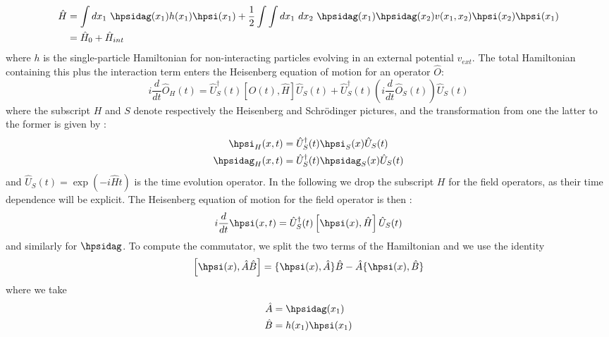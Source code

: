 \begin{align}
\begin{split}
 	\hat{H} &= \int dx_1 \ \hpsidag(x_1) h(x_1) \hpsi(x_1) + \frac{1}{2} \int\int dx_1 \  dx_2 \ \hpsidag(x_1) \hpsidag(x_2) v(x_1,x_2) \hpsi(x_2)\hpsi(x_1) \\
		&= \hat{H}_0 + \hat{H}_{int}
\end{split}
\end{align}
where $h$ is the single-particle Hamiltonian for non-interacting particles evolving in an external potential $v_{ext}$. The total Hamiltonian containing this plus the interaction term enters the Heisenberg equation of motion for an operator $\hat{O}$:
\begin{equation}
	i\frac{d}{d t}\hat{O}_H(t) = \hat{U}^\dagger_S(t) \left[ \hat{O}(t),\hat{H} \right] \hat{U}_S(t) + \hat{U}^\dagger_S(t) (i \frac{d}{dt} \hat{O}_S(t)) \hat{U}_S(t)
\end{equation}
where the subscript $H$ and $S$ denote respectively the Heisenberg and Schrödinger pictures, and the transformation from one the latter to the former is given by :
\begin{align}
\begin{split}
	\hpsi_H(x,t) &= \hat{U}^\dagger_S(t) \hpsi_S(x) \hat{U}_S(t) \\
	\hpsidag_H(x,t) &= \hat{U}^\dagger_S(t) \hpsidag_S(x) \hat{U}_S(t)
\end{split}
\end{align}
and $\hat{U}_S(t) = \exp(-i\hat{H}t) $ is the time evolution operator. In the following we drop the subscript $H$ for the field operators, as their time dependence will be explicit. The Heisenberg equation of motion for the field operator is then :
\begin{equation}
	i\frac{d}{dt} \hpsi(x,t) = \hat{U}^\dagger_S(t) \left[ \hpsi(x),\hat{H} \right] \hat{U}_S(t)
\end{equation}
and similarly for $\hpsidag$. To compute the commutator, we split the two terms of the Hamiltonian and we use the identity 
\begin{equation}
	\left[ \hpsi(x),\hat{A}\hat{B} \right] = \{ \hpsi(x),\hat{A} \}\hat{B} -  \hat{A}\{ \hpsi(x), \hat{B} \}
\end{equation}
where we take
\begin{align} 
\begin{split}
	\hat{A} &= \hpsidag(x_1) \\
	\hat{B} &= h(x_1) \hpsi(x_1)
\end{split}
\end{align}
